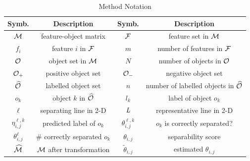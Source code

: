 \begin{table}[t!]
\centering
\small
\begin{tabular}{|c|c|c|c|}
 \hline
 Symb. & Description & Symb. & Description\\
 \hline
 \hline
 ${\mathcal{M}}$ & feature-object matrix & ${\mathcal{F}}$ & feature set in ${\mathcal{M}}$ \\
 \hline
 $f_i$ & feature $i$ in ${\mathcal{F}}$ & $m$ & number of features in ${\mathcal{F}}$\\
 \hline
 ${\mathcal{O}}$ & object set in ${\mathcal{M}}$ & $N$ & number of objects in ${\mathcal{O}}$\\
 \hline
 ${\mathcal{O}}_+$ & positive object set & ${\mathcal{O}}_-$ & negative object set\\
 \hline
 $\widehat{{\mathcal{O}}}$ & labelled object set & $n$ & number of labelled objects in $\widehat{{\mathcal{O}}}$\\
 \hline
 $o_k$ & object $k$ in $\widehat{{\mathcal{O}}}$ & $l_k$ & label of object $o_k$\\
 \hline
 $\ell$ & separating line in 2-D & $\mathit{L}$ & representative line in 2-D\\
 \hline
 $\eta_{i,j}^{\ell,k}$ & predicted label of $o_k$ & $\theta_{i,j}^{\ell,k}$ & $o_k$ is correctly separated? \\
 \hline
 $\theta_{i,j}^{\ell}$ & \# correctly separated $o_k$ & $\theta_{i,j}$ & separability score\\
 \hline
 $\widehat{{\mathcal{M}}}$ & ${\mathcal{M}}$ after transformation & $\tilde{\theta}_{i,j}$ & estimated $\theta_{i,j}$\\
 \hline
 \end{tabular}
\caption{\genviz Method Notation}
\label{tbl:notation}
\vspace{-18pt}
\end{table}


